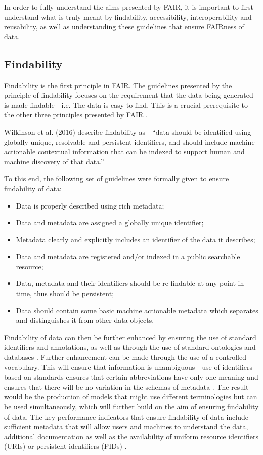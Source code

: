 \documentclass{cisfyp}
\begin{document}
In order to fully understand the aims presented by FAIR, it is important to first understand what is truly meant by findability, accessibility, interoperability and reusability, as well as understanding these guidelines that ensure FAIRness of data.\pagebreak



\subsection{Findability}
Findability is the first principle in FAIR. The guidelines presented by the principle of findability focuses on the requirement that the data being generated is made findable - i.e. The data is easy to find. This is a crucial prerequisite to the other three principles presented by FAIR \cite{Wise2019}.

Wilkinson et al. (2016) describe findability as - ``data should be identified using globally unique, resolvable and persistent identifiers, and should include machine-actionable contextual information that can be indexed to support human and machine discovery of that data.''

To this end, the following set of guidelines were formally given to ensure findability of data: 
\begin{itemize}
	\item Data is properly described using rich metadata;\item Data and metadata are assigned a globally unique identifier;\item Metadata clearly and explicitly includes an identifier of the data it describes;\item Data and metadata are registered and/or indexed in a public searchable resource;\item Data, metadata and their identifiers should be re-findable at any point in time, thus should be persistent;\item Data should contain some basic machine actionable metadata which separates and distinguishes it from other data objects.
\end{itemize}

Findability of data can then be further enhanced by ensuring the use of standard identifiers and annotations, as well as through the use of standard ontologies and databases \cite{Wittig2017}. Further enhancement can be made through the use of a controlled vocabulary. This will ensure that information is unambiguous - use of identifiers based on standards ensures that certain abbreviations have only one meaning and ensures that there will be no variation in the schemas of metadata \cite{Wittig2017, Wise2019}. The result would be the production of models that might use different terminologies but can be used simultaneously, which will further build on the aim of ensuring findability of data.
The key performance indicators that ensure findability of data include sufficient metadata that will allow users and machines to understand the data, additional documentation as well as the availability of uniform resource identifiers (URIs) or persistent identifiers (PIDs) \cite{Wise2019}.
\end{document}
